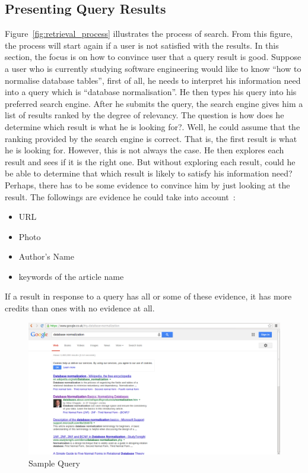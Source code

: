 \subsection{Presenting Query Results}\label{sec:presentingQueryResult}
Figure~\ref{fig:retrieval_process} illustrates the process of search. From this figure, the process will start again if a user is not satisfied with 
the results. In this section, the focus is on how to convince user that a query result is good. Suppose a user who is currently studying software engineering
would like to know ``how to normalise database tables'', first of all, he needs to interpret his information need into a query which is ``database normalisation''.
He then types his query into his preferred search engine. After he submits the query, the search engine gives him a list of results ranked by the degree
of relevancy. The question is how does he determine which result is what he is looking for?. Well, he could assume that the ranking provided by the search 
engine is correct. That is, the first result is what he is looking for. However, this is not always the case. He then explores each result and sees if 
it is the right one. But without exploring each result, could he be able to determine that which result is likely to satisfy his information need?
Perhaps, there has to be some evidence to convince him by just looking at the result. The followings are evidence he could take into account~\cite{craig}: 
\begin{itemize}
 \item URL
 \item Photo
 \item Author's Name
 \item keywords of the article name
\end{itemize}
If a result in response to a query has all or some of these evidence, it has more credits than ones with no evidence at all. 
\begin{figure}
\centering
\includegraphics[scale=0.3]{./figures/query.png}
\caption{Sample Query} \label{fig:query}
\end{figure}
